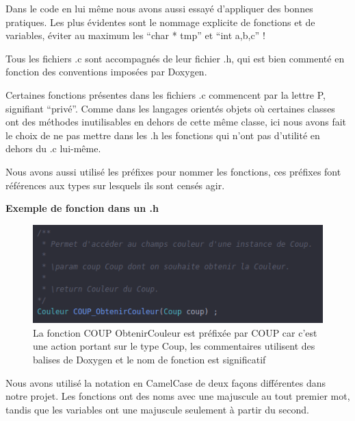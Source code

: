 \hspace{3em}
Dans le code en lui même nous avons aussi essayé d’appliquer des bonnes pratiques. Les plus évidentes sont le nommage explicite de fonctions et de variables, éviter au maximum les “char * tmp” et “int a,b,c” !

	Tous les fichiers .c sont accompagnés de leur fichier .h, qui est bien commenté en fonction des conventions imposées par Doxygen.

Certaines fonctions présentes dans les fichiers .c commencent par la lettre P, signifiant “privé”. Comme dans les langages orientés objets où certaines classes ont des méthodes inutilisables en dehors de cette même classe, ici nous avons fait le choix de ne pas mettre dans les .h les fonctions qui n’ont pas d’utilité en dehors du .c lui-même.

	Nous avons aussi utilisé les préfixes pour nommer les fonctions, ces préfixes font références aux types sur lesquels ils sont censés agir.

  \begin{center}
  \textbf{Exemple de fonction dans un .h}
  \end{center}
  \begin{figure}[h]
    \includegraphics[width=18cm]{./sourcesIMAGES/obtenircouleur.png}
    \caption{La fonction COUP ObtenirCouleur est préfixée par COUP car c’est une action portant sur le type Coup, les commentaires utilisent des balises de Doxygen et le nom de fonction est significatif}
  \end{figure}

  Nous avons utilisé la notation en CamelCase de deux façons différentes dans notre projet. Les fonctions ont des noms avec une majuscule au tout premier mot, tandis que les variables ont une majuscule seulement à partir du second.
